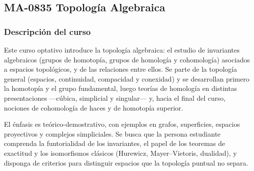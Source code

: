 \newpage
\subsection*{MA-0835 Topología Algebraica}


\hypertarget{MA0835}{}
\begin{refsection}
\begin{table}[H]
\end{table}

\subsubsection*{Descripción del curso}

Este curso optativo introduce la topología algebraica: el estudio de invariantes algebraicos (grupos de homotopía, grupos de homología y cohomología) asociados a espacios topológicos, y de las relaciones entre ellos. Se parte de la topología general (espacios, continuidad, compacidad y conexidad) y se desarrollan primero la homotopía y el grupo fundamental, luego teorías de homología en distintas presentaciones ---cúbica, simplicial y singular--- y, hacia el final del curso, nociones de cohomología de haces y de homotopía superior.

El énfasis es teórico-demostrativo, con ejemplos en grafos, superficies, espacios proyectivos y complejos simpliciales. Se busca que la persona estudiante comprenda la funtorialidad de los invariantes, el papel de los teoremas de exactitud y los isomorfismos clásicos (Hurewicz, Mayer--Vietoris, dualidad), y disponga de criterios para distinguir espacios que la topología puntual no separa.


\end{refsection}
